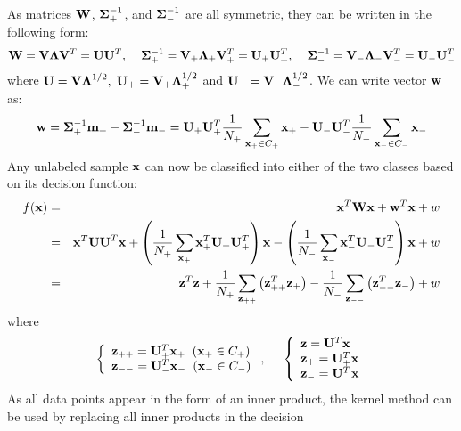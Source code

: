 \documentclass{article}
\begin{document}
As matrices ${\bf W}$, ${\bf\Sigma}_+^{-1}$, and ${\bf\Sigma}_-^{-1}$ 
are all symmetric, they can be written in the following
 form:
\begin{equation}
  {\bf W}={\bf V}{\bf\Lambda}{\bf V}^T={\bf U}{\bf U}^T, \;\;\;\;
  {\bf\Sigma}_+^{-1}={\bf V}_+{\bf\Lambda}_+{\bf V}_+^T={\bf U}_+{\bf U}_+^T, 
  \;\;\;\;
  {\bf\Sigma}_-^{-1}={\bf V}_-{\bf\Lambda}_-{\bf V}_-^T={\bf U}_-{\bf U}_-^T
\end{equation}
where ${\bf U}={\bf V\Lambda}^{1/2},\;{\bf U}_+={\bf V}_+{\bf\Lambda}_+^{1/2}$
and ${\bf U}_-={\bf V}_-{\bf\Lambda}_-^{1/2}$. We can write vector ${\bf w}$ 
as:
\begin{equation}
  {\bf w}={\bf \Sigma}_+^{-1}{\bf m}_+-{\bf \Sigma}_-^{-1}{\bf m}_-
  ={\bf U}_+{\bf U}_+^T\frac{1}{N_+}\sum_{{\bf x}_+\in C_+}{\bf x}_+
  -{\bf U}_-{\bf U}_-^T\frac{1}{N_-}\sum_{{\bf x}_-\in C_-}{\bf x}_-
\end{equation}
Any unlabeled sample ${\bf x}$ can now be classified into either 
of the two classes based on its decision function:
\begin{eqnarray}
  f({\bf x})&=&{\bf x}^T{\bf W}{\bf x}+{\bf w}^T{\bf x}+w
  \nonumber\\
  &=&{\bf x}^T{\bf UU}^T{\bf x}
  +\left(\frac{1}{N_+}\sum_{{\bf x}_+}{\bf x}_+^T{\bf U}_+{\bf U}_+^T\right){\bf x}
  -\left(\frac{1}{N_-}\sum_{{\bf x}_-}{\bf x}_-^T{\bf U}_-{\bf U}_-^T\right){\bf x}
  +w
  \nonumber\\
  &=&{\bf z}^T{\bf z}
  +\frac{1}{N_+}\sum_{{\bf z}_{++}}\left({\bf z}_{++}^T{\bf z}_+\right)
  -\frac{1}{N_-}\sum_{{\bf z}_{--}}\left({\bf z}_{--}^T{\bf z}_-\right)+w
\end{eqnarray}
where 
\begin{equation}
  \left\{\begin{array}{l}{\bf z}_{++}={\bf U}_+^T{\bf x}_+\;\;({\bf x}_+\in C_+)\\
  {\bf z}_{--}={\bf U}_-^T{\bf x}_-\;\;({\bf x}_-\in C_-)\end{array}\right.,
  \;\;\;\;\;
  \left\{\begin{array}{l}
           {\bf z}={\bf U}^T{\bf x}\\
           {\bf z}_+={\bf U}_+^T{\bf x}\\
           {\bf z}_-={\bf U}_-^T{\bf x}
  \end{array}\right.
\end{equation}
As all data points appear in the form of an inner product, the kernel 
method can be used by replacing all inner products in the decision
\end{document}
